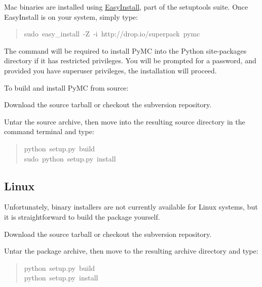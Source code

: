 Mac binaries are installed using \href{http://peak.telecommunity.com/DevCenter/EasyInstall}{EasyInstall}, part of the setuptools suite. 
Once EasyInstall is on your system, simply type:
\begin{quote}{\ttfamily \raggedright \noindent
sudo~easy{\_}install~-Z~-i~http://drop.io/superpack~pymc
}\end{quote}

The  command will be required to install PyMC into the Python site-packages 
directory if it has restricted privileges. You will be prompted for a  password, and 
provided you have superuser privileges, the installation will proceed.

To build and install PyMC from source:
\begin{list}{.}
{
\setlength{\rightmargin}{\leftmargin}
}
\item {} 
Download the source tarball or checkout the subversion repository.

\item {} 
Untar the source archive, then move into the resulting source directory in
the command terminal and type:
\begin{quote}{\ttfamily \raggedright \noindent
python~setup.py~build~\\
sudo~python~setup.py~install
}\end{quote}

\end{list}



\hypertarget{linux}{}
\subsection*{Linux}

Unfortunately, binary installers are not currently available for Linux systems, 
but it is straightforward to build the package yourself.
\begin{list}{.}
{
\setlength{\rightmargin}{\leftmargin}
}
\item {} 
Download the source tarball or checkout the subversion repository.

\item {} 
Untar the package archive, then move to the resulting archive directory and type:
\begin{quote}{\ttfamily \raggedright \noindent
python~setup.py~build~\\
python~setup.py~install
}\end{quote}

\end{list}

